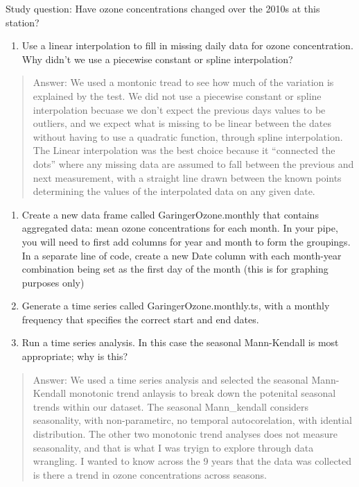 \documentclass[]{article}
\providecommand{\tightlist}{%
  \setlength{\itemsep}{0pt}\setlength{\parskip}{0pt}}
\begin{document}
Study question: Have ozone concentrations changed over the 2010s at this
station?

\begin{enumerate}
\def\labelenumi{\arabic{enumi}.}
\setcounter{enumi}{7}
\tightlist
\item
  Use a linear interpolation to fill in missing daily data for ozone
  concentration. Why didn't we use a piecewise constant or spline
  interpolation?
\end{enumerate}

\begin{quote}
Answer: We used a montonic tread to see how much of the variation is
explained by the test. We did not use a piecewise constant or spline
interpolation becuase we don't expect the previous days values to be
outliers, and we expect what is missing to be linear between the dates
without having to use a quadratic function, through spline
interpolation. The Linear interpolation was the best choice because it
``connected the dots'' where any missing data are assumed to fall
between the previous and next measurement, with a straight line drawn
between the known points determining the values of the interpolated data
on any given date.
\end{quote}

\begin{enumerate}
\def\labelenumi{\arabic{enumi}.}
\setcounter{enumi}{8}
\item
  Create a new data frame called GaringerOzone.monthly that contains
  aggregated data: mean ozone concentrations for each month. In your
  pipe, you will need to first add columns for year and month to form
  the groupings. In a separate line of code, create a new Date column
  with each month-year combination being set as the first day of the
  month (this is for graphing purposes only)
\item
  Generate a time series called GaringerOzone.monthly.ts, with a monthly
  frequency that specifies the correct start and end dates.
\item
  Run a time series analysis. In this case the seasonal Mann-Kendall is
  most appropriate; why is this?
\end{enumerate}

\begin{quote}
Answer: We used a time series analysis and selected the seasonal
Mann-Kendall monotonic trend anlaysis to break down the potenital
seasonal trends within our dataset. The seasonal Mann\_kendall considers
seasonality, with non-parametirc, no temporal autocorelation, with
idential distribution. The other two monotonic trend analyses does not
measure seasonality, and that is what I was tryign to explore through
data wrangling. I wanted to know across the 9 years that the data was
collected is there a trend in ozone concentrations across seasons.
\end{quote}
\end{document}
